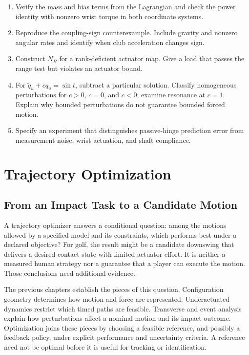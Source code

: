 \documentclass[12pt, openany]{book}
\theoremstyle{plain}
\begin{document}
\begin{enumerate}
\item Verify the mass and bias terms from the Lagrangian and check the power
identity with nonzero wrist torque in both coordinate systems.
\item Reproduce the coupling-sign counterexample. Include gravity and nonzero
angular rates and identify when club acceleration changes sign.
\item Construct $N_B$ for a rank-deficient actuator map. Give a load that passes
the range test but violates an actuator bound.
\item For $\ddot q_u+cq_u=\sin t$, subtract a particular solution. Classify
homogeneous perturbations for $c>0$, $c=0$, and $c<0$; examine resonance at $c=1$.
Explain why bounded perturbations do not guarantee bounded forced motion.
\item Specify an experiment that distinguishes passive-hinge prediction error
from measurement noise, wrist actuation, and shaft compliance.
\end{enumerate}


\chapter{Trajectory Optimization}
\label{ch:trajectory_optimization}

\section{From an Impact Task to a Candidate Motion}

A trajectory optimizer answers a conditional question: among the motions
allowed by a specified model and its constraints, which performs best under
a declared objective? For golf, the result might be a candidate downswing
that delivers a desired contact state with limited actuator effort. It is
neither a measured human strategy nor a guarantee that a player can execute
the motion. Those conclusions need additional evidence.

The previous chapters establish the pieces of this question. Configuration
geometry determines how motion and force are represented. Underactuated
dynamics restrict which timed paths are feasible. Transverse and event
analysis explain how perturbations affect a nominal motion and its impact
outcome. Optimization joins these pieces by choosing a feasible reference,
and possibly a feedback policy, under explicit performance and uncertainty
criteria. A reference need not be optimal before it is useful for tracking
or identification.
\end{document}
